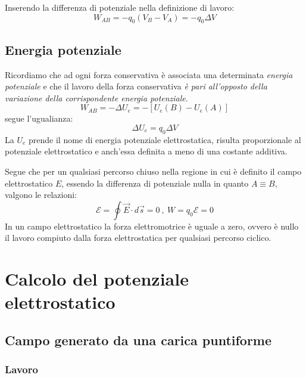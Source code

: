 \documentclass[class=book, crop=false, oneside, 12pt]{standalone}
\begin{document}
Inserendo la differenza di potenziale nella definizione di lavoro:
\begin{equation}
    W_{AB} = -q_0 \left(V_B - V_A\right) = -q_0 \Delta V
\end{equation}

\subsection*{Energia potenziale}

Ricordiamo che ad ogni forza conservativa è associata una determinata \emph{energia potenziale} e che il lavoro della forza  conservativa \emph{è pari all'opposto della variazione della corrispondente energia potenziale}.
\begin{equation*}
    W_{AB} = - \Delta U_e = - \left[U_e (B) - U_e (A)\right]
\end{equation*}
segue l'ugualianza:
\begin{equation}
    \Delta U_e = q_0 \Delta V
\end{equation}
La \(U_e\) prende il nome di energia potenziale elettrostatica, risulta proporzionale al potenziale elettrostatico e anch'essa definita a meno di una costante additiva. 

Segue che per un qualsiasi percorso chiuso nella regione in cui è definito il campo elettrostatico \(E\), essendo la differenza di potenziale nulla in quanto \(A \equiv B\), valgono le relazioni:
\begin{equation}
    \mathcal{E} = \oint \overrightarrow{E} \cdot d \overrightarrow{s} = 0 \ , \ W = q_0 \mathcal{E} = 0
\end{equation}
In un campo elettrostatico la forza elettromotrice è uguale a zero, ovvero è nullo il lavoro compiuto dalla forza elettrostatica per qualsiasi percorso ciclico.

\section{Calcolo del potenziale elettrostatico}

\subsection*{Campo generato da una carica puntiforme}

\subsubsection*{Lavoro}
\end{document}
